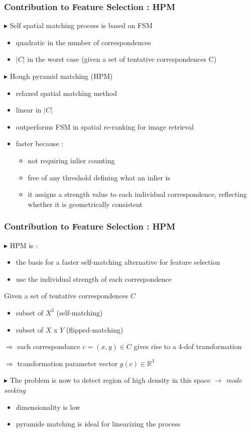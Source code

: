 \documentclass[11pt]{beamer}
\begin{document}
\begin{frame}
\frametitle{Contribution to Feature Selection : HPM}
$\blacktriangleright$ Self spatial matching process is based on FSM
\begin{itemize}
\item quadratic in the number of correspondences
\item $\vert C \vert$ in the worst case (given a set of tentative correspondences C)
\end{itemize}

$\blacktriangleright$ Hough pyramid matching (HPM)
\begin{itemize}
\item relaxed spatial matching method
\item linear in $\vert C \vert$
\item outperforms FSM in spatial re-ranking for image retrieval
\item faster because :
\begin{itemize}
\item not requiring inlier counting
\item free of any threshold defining what an inlier is
\item it assigns a strength value to each individual correspondence, reflecting whether it is geometrically consistent
\end{itemize}
\end{itemize}
\end{frame}

\begin{frame}
\frametitle{Contribution to Feature Selection : HPM}
$\blacktriangleright$ HPM is :
\begin{itemize}
\item the basis for a faster self-matching alternative for feature selection
\item use the individual strength of each correspondence
\end{itemize}
Given a set of tentative correspondences $C$
\begin{itemize}
\item subset of $X^2$ (self-matching)
\item subset of $X$ x $Y$ (flipped-matching)
\end{itemize}
$\Rightarrow$ each correspondance $c = (x,y) \in C$ gives rise to a 4-dof transformation

$\Rightarrow$ transformation parameter vector $g(c) \in \mathbb{R}^3$

$\blacktriangleright$ The problem is now to detect region of high density in this space $\rightarrow$ \textit{mode seeking}
\begin{itemize}
\item dimensionality is low
\item pyramide matching is ideal for linearizing the process
\end{itemize}

\end{frame}
\end{document}
